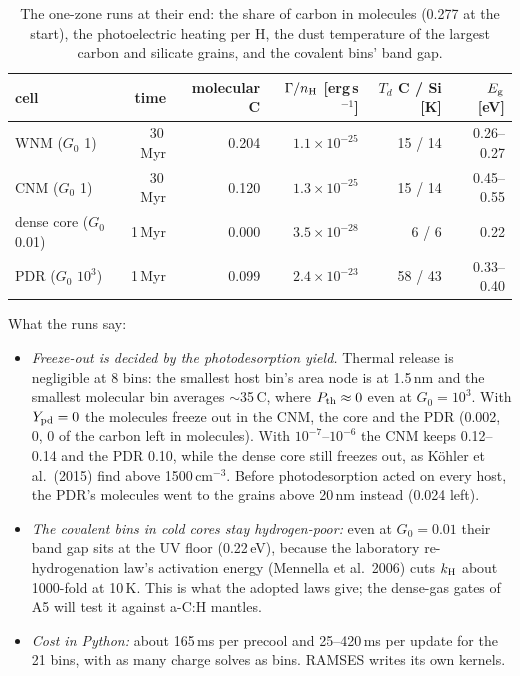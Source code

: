 \documentclass[11pt,a4paper]{article}
\newcommand{\Eg}{E_{\rm g}}
\begin{document}
\begin{table}[H]
\centering\small
\caption{The one-zone runs at their end: the share of carbon in molecules (0.277 at the start), the photoelectric
heating per H, the dust temperature of the largest carbon and silicate grains, and the covalent bins' band gap.}
\label{tab:demo}
\begin{tabular}{@{}l r r r r r@{}}
\toprule
cell & time & molecular C & $\Gamma/n_{\rm H}$ [erg\,s$^{-1}$] & $T_d$ C / Si [K] & $\Eg$ [eV] \\
\midrule
WNM ($G_0$ 1) & 30\,Myr & 0.204 & $1.1\times10^{-25}$ & 15 / 14 & 0.26--0.27 \\
CNM ($G_0$ 1) & 30\,Myr & 0.120 & $1.3\times10^{-25}$ & 15 / 14 & 0.45--0.55 \\
dense core ($G_0$ 0.01) & 1\,Myr & 0.000 & $3.5\times10^{-28}$ & 6 / 6 & 0.22 \\
PDR ($G_0$ $10^3$) & 1\,Myr & 0.099 & $2.4\times10^{-23}$ & 58 / 43 & 0.33--0.40 \\
\bottomrule
\end{tabular}
\end{table}

What the runs say:
\begin{itemize}
\item \emph{Freeze-out is decided by the photodesorption yield.} Thermal release is negligible at 8 bins: the smallest
  host bin's area node is at 1.5\,nm and the smallest molecular bin averages $\sim$35\,C, where $P_{\rm th}\approx0$
  even at $G_0 = 10^3$. With $Y_{\rm pd} = 0$ the molecules freeze out in the CNM, the core and the PDR (0.002, 0, 0 of
  the carbon left in molecules). With $10^{-7}$--$10^{-6}$ the CNM keeps 0.12--0.14 and the PDR 0.10, while the
  dense core still freezes out, as Köhler et al.\ (2015) find above 1500\,cm$^{-3}$. Before photodesorption acted on
  every host, the PDR's molecules went to the grains above 20\,nm instead (0.024 left).
\item \emph{The covalent bins in cold cores stay hydrogen-poor:} even at $G_0 = 0.01$ their band gap sits at the UV
  floor (0.22\,eV), because the laboratory re-hydrogenation law's activation energy (Mennella et al.\ 2006) cuts $k_{\rm
  H}$ about 1000-fold at 10\,K. This is what the adopted laws give; the dense-gas gates of A5 will test it against
  a-C:H mantles.
\item \emph{Cost in Python:} about 165\,ms per precool and 25--420\,ms per update for the 21 bins, with as many charge
  solves as bins. RAMSES writes its own kernels.
\end{itemize}
\end{document}
